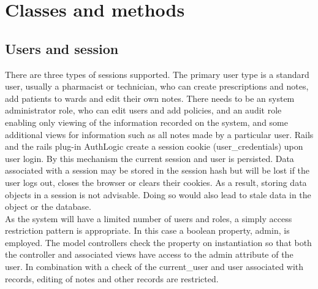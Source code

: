 \documentclass[letterpaper]{amsart}
\begin{document}
\section{Classes and methods}
\subsection{Users and session} 
There are three types of sessions supported.  The primary user type is a standard user, usually a pharmacist or technician, who can create prescriptions and notes, add patients to wards and edit their own notes.  There needs to be an system administrator role, who can edit users and add policies, and an audit role enabling only viewing of the information recorded on the system, and some additional views for information such as all notes made by a particular user.
Rails and the rails plug-in AuthLogic create a session cookie (user\_credentials) upon user login.  By this mechanism the current session and user is persisted.  Data associated with a session may be stored in the session hash but will be lost if the user logs out, closes the browser or clears their cookies.  As a result, storing data objects in a session is not advisable.  Doing so would also lead to stale data in the object or the database.\\
As the system will have a limited number of users and roles, a simply access restriction pattern is appropriate.  In this case a boolean property, admin, is employed.  The model controllers check the property on instantiation so that both the controller and associated views have access to the admin attribute of the user.  In combination with a check of the current\_user and user associated with records, editing of notes and other records are restricted.
\end{document}
